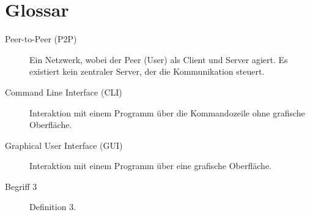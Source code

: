 \section*{Glossar}

\begin{description}
    \item[Peer-to-Peer (P2P)] Ein Netzwerk, wobei der Peer (User) als Client und Server agiert. Es existiert kein zentraler Server, der die Kommunikation steuert.
    \item[Command Line Interface (CLI)] Interaktion mit einem Programm über die Kommandozeile ohne grafische Oberfläche.
    \item[Graphical User Interface (GUI)] Interaktion mit einem Programm über eine grafische Oberfläche.
    \item[Begriff 3] Definition 3.
\end{description}


\newpage
